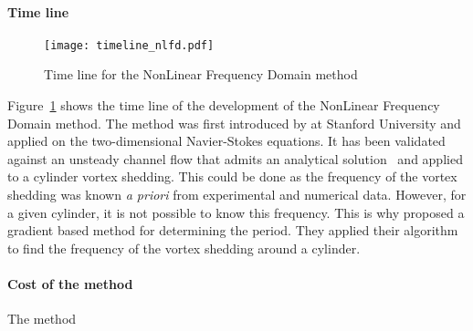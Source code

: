 \paragraph{Time line}
\begin{figure}[htbp]
  \centering
  \texttt{[image: timeline\_nlfd.pdf]}
  \caption{Time line for the NonLinear Frequency Domain method}
  \label{fig:timeline_nlfd}
\end{figure}
Figure~\ref{fig:timeline_nlfd} shows the time line of the
development of the NonLinear Frequency Domain method.
The method was first introduced by \citet{McMullen2001}
at Stanford University and applied on the two-dimensional
Navier-Stokes equations. It has been validated against an
unsteady channel flow that admits an analytical 
solution~\cite{Merkle1987} and applied to a cylinder
vortex shedding. This could be done as the frequency of the
vortex shedding was known \textit{a priori} from experimental
and numerical data. However, for a given cylinder, it is not
possible to know this frequency. This is why \citet{McMullen2002}
proposed a gradient based method for determining the period.
They applied their algorithm to find the frequency of the vortex
shedding around a cylinder.

\paragraph{Cost of the method}
The method 